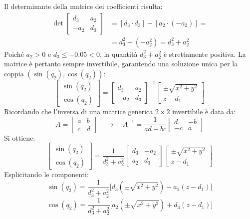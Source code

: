 \documentclass[11pt, a4paper]{report}
\begin{document}
Il determinante della matrice dei coefficienti risulta:
\begin{align*}
    \det \begin{bmatrix}
        d_{3} & a_{2} \\
        -a_{2} & d_{3}
    \end{bmatrix} &= [d_{3} \cdot d_{3}] - [a_{2} \cdot (- a_{2})] =\\
    & = d_{3}^{2} - (-a_{2}^{2}) = d_{3}^{2} + a_{2}^{2}
\end{align*}
Poiché $a_2 > 0$ e $d_3 \le -0.05 < 0$, la quantità $d_{3}^{2} + a_{2}^{2}$ è strettamente positiva. La matrice è pertanto sempre invertibile, garantendo una soluzione unica per la coppia $(\sin(q_2), \cos(q_2))$:
\[
    \begin{bmatrix}
        \sin(q_2)\\
        \cos(q_2)
    \end{bmatrix}
    =
    \begin{bmatrix}
        d_{3} & a_{2} \\
        -a_{2} & d_{3}
    \end{bmatrix}^{-1}
    \begin{bmatrix}
        \pm \sqrt{x^2+y^2} \\
        z - d_1
    \end{bmatrix}
\]
Ricordando che l'inversa di una matrice generica $2 \times 2$ invertibile è data da:
\[
A=\begin{bmatrix}
a & b\\
c & d
\end{bmatrix}
\quad\longrightarrow\quad
A^{-1}=
\frac{1}{ad-bc}
\begin{bmatrix}
    d & -b \\
    -c & a
\end{bmatrix}
\]
Si ottiene:
\[
    \begin{bmatrix}
        \sin(q_2)\\
        \cos(q_2)
    \end{bmatrix}
    =
    \frac{1}{d_{3}^{2} + a_{2}^{2}}
    \begin{bmatrix}
        d_{3} & -a_{2} \\
        a_{2} & d_{3}
    \end{bmatrix}
    \begin{bmatrix}
        \pm \sqrt{x^2+y^2} \\
        z - d_1
    \end{bmatrix}
\]
Esplicitando le componenti:
\[
    \boxed{
        \sin(q_{2}) = \frac{1}{d_{3}^{2} + a_{2}^{2}} \biggl[d_{3} (\pm \sqrt{x^2+y^2}) - a_{2} (z - d_1)\biggr]
    }
\]
\[
    \boxed{
        \cos(q_{2}) = \frac{1}{d_{3}^{2} + a_{2}^{2}} \biggl[a_{2} (\pm \sqrt{x^2+y^2}) + d_{3} (z - d_1)\biggr]
    }
\]
\end{document}
